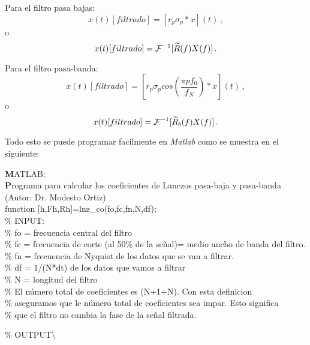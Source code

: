 \documentclass[
]{agujournal2019}
\begin{document}
Para el filtro pasa bajas:
\[x(t)[{ filtrado}]=[r_p \sigma_p * x](t)\,,\] o
\[x(t)[{ filtrado}]={\cal F}^{-1}[\widetilde{R}(f)X(f)]\,.\]

Para el filtro pasa-banda:
\[x(t)[{ filtrado}]=[r_p \sigma_p cos\left( \frac{\pi p f_0}{f_N}\right)*x](t)\,,\]
o \[x(t)[{ filtrado}]={\cal F}^{-1}[\widetilde{R}_b(f)X(f)]\,.\]

Todo esto se puede programar facilmente en \emph{Matlab} como se muestra
en el siguiente:

\begin{framed}
{\noindent \textbf MATLAB:}\\
{\textbf Programa para calcular los coeficientes de Lanczos pasa-baja y pasa-banda (Autor: Dr. Modesto Ortiz)}\\
{\noindent}function [h,Fh,Rh]=lnz\_co(fo,fc,fn,N,df);\\
\% INPUT:\\
\% fo = frecuencia central del filtro\\
\% fc = frecuencia de corte (al 50\% de la señal)= medio ancho de banda del filtro.\\
\% fn = frecuencia de Nyquist de los datos que se van a filtrar.\\
\% df = 1/(N*dt) de los datos que vamos a filtrar\\
\% N  = longitud del filtro\\
\% El número total de coeficientes es (N+1+N). Con esta definicion\\
\% aseguramos que le número total de coeficientes sea impar. Esto significa\\
\% que el filtro no cambia la fase de la señal filtrada.\\
\end{framed}

\% OUTPUT\textbackslash{}
\end{document}
